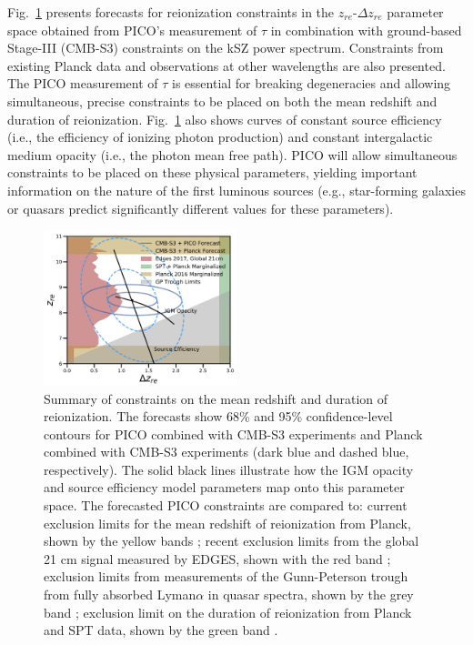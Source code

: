 \documentclass[PICOReport.tex]{subfiles}
\begin{document}
Fig.~\ref{fig:ReionizationPICO} presents forecasts for reionization constraints in the $z_{re}$-$\Delta z_{re}$ parameter space obtained from PICO's measurement of $\tau$ in combination with ground-based Stage-III (CMB-S3) constraints on the kSZ power spectrum.  Constraints from existing Planck data and observations at other wavelengths are also presented.  The PICO measurement of $\tau$ is essential for breaking degeneracies and allowing simultaneous, precise constraints to be placed on both the mean redshift and duration of reionization.  Fig.~\ref{fig:ReionizationPICO} also shows curves of constant source efficiency (i.e., the efficiency of ionizing photon production) and constant intergalactic medium opacity (i.e., the photon mean free path).  PICO will allow simultaneous constraints to be placed on these physical parameters, yielding important information on the nature of the first luminous sources (e.g., star-forming galaxies or quasars predict significantly different values for these parameters).

\begin{figure}
\begin{center}
\includegraphics[width=0.5\textwidth]{images/Reionization_Contours_zbar_delz_PICO_NEW.pdf}
\end{center}
\caption{\label{fig:ReionizationPICO} Summary of constraints on the mean redshift and duration of reionization. The forecasts show 68\% and 95\% confidence-level contours for PICO combined with CMB-S3 experiments and Planck combined with CMB-S3 experiments (dark blue and dashed blue, respectively). The solid black lines illustrate how the IGM opacity and source efficiency model parameters map onto this parameter space. The forecasted PICO constraints are compared to: current exclusion limits for the mean redshift of reionization from Planck, shown by the yellow bands \citealp{planck2018:parameters}; recent exclusion limits from the global 21 cm signal measured by EDGES, shown with the red band \citealp{edges2017}; exclusion limits from measurements of the Gunn-Peterson trough from fully absorbed Lyman$\alpha$ in quasar spectra, shown by the grey band \citealp{Fan2006}; exclusion limit on the duration of reionization from Planck and SPT data, shown by the green band \citealp{planck_reio:2016}.}
\end{figure}
\end{document}
